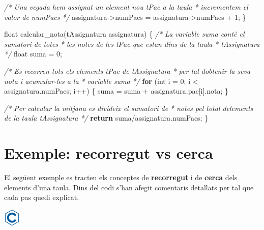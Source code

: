 \documentclass[]{book}
\newenvironment{Shaded}{\begin{snugshade}}{\end{snugshade}}
\newcommand{\CommentTok}[1]{\textcolor[rgb]{0.56,0.35,0.01}{\textit{#1}}}
\newcommand{\ControlFlowTok}[1]{\textcolor[rgb]{0.13,0.29,0.53}{\textbf{#1}}}
\newcommand{\DataTypeTok}[1]{\textcolor[rgb]{0.13,0.29,0.53}{#1}}
\newcommand{\DecValTok}[1]{\textcolor[rgb]{0.00,0.00,0.81}{#1}}
\newcommand{\NormalTok}[1]{#1}
\begin{document}
\begin{Shaded}
\begin{Highlighting}[]
    \CommentTok{/* Una vegada hem assignat un element nou tPac a la taula}
\CommentTok{     * incrementem el valor de numPacs }
\CommentTok{     */}
\NormalTok{    assignatura{-}\textgreater{}numPacs = assignatura{-}\textgreater{}numPacs + }\DecValTok{1}\NormalTok{;}
\NormalTok{\}}

\DataTypeTok{float}\NormalTok{ calcular\_nota(tAssignatura assignatura) \{}
    \CommentTok{/* La variable suma conté el sumatori de totes}
\CommentTok{     * les notes de les tPac que estan dins de la taula}
\CommentTok{     * tAssignatura }
\CommentTok{     */}
    \DataTypeTok{float}\NormalTok{ suma = }\DecValTok{0}\NormalTok{;}

    \CommentTok{/* Es recorren tots els elements tPac de tAssignatura}
\CommentTok{     * per tal d\textquotesingle{}obtenir la seva nota i acumular{-}les a la}
\CommentTok{     * variable suma }
\CommentTok{     */}
    \ControlFlowTok{for}\NormalTok{ (}\DataTypeTok{int}\NormalTok{ i = }\DecValTok{0}\NormalTok{; i \textless{} assignatura.numPacs; i++) \{}
\NormalTok{        suma = suma + assignatura.pac[i].nota;}
\NormalTok{    \}}

    \CommentTok{/* Per calcular la mitjana es divideix el sumatori de}
\CommentTok{     * notes pel total d\textquotesingle{}elements de la taula tAssignatura }
\CommentTok{     */}
   \ControlFlowTok{return}\NormalTok{ suma/assignatura.numPacs;}
\NormalTok{\}}
\end{Highlighting}
\end{Shaded}

\hypertarget{exemple-recorregut-vs-cerca}{%
\section{Exemple: recorregut vs cerca}\label{exemple-recorregut-vs-cerca}}

El següent exemple es tracten els conceptes de \textbf{recorregut} i de \textbf{cerca} dels elements d'una taula. Dins del codi s'han afegit comentaris detallats per tal que cada pas quedi explicat.

\includegraphics{./img/c.png}
\end{document}
